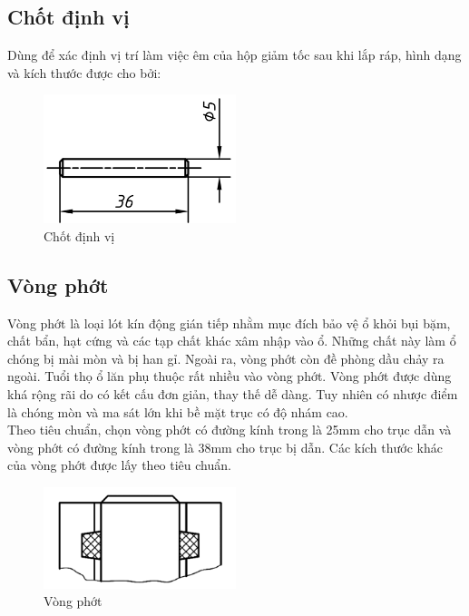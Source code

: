 \subsection{Chốt định vị}
Dùng để xác định vị trí làm việc êm của hộp giảm tốc sau khi lắp ráp, hình dạng và kích thước được cho bởi:
\begin{figure}[H]
    \centering
    \includegraphics[width=0.5\textwidth]{pictures/chotdinhvi.png}
    \caption{Chốt định vị}
\end{figure}
\subsection{Vòng phớt}
Vòng phớt là loại lót kín động gián tiếp nhằm mục đích bảo vệ ổ khỏi bụi bặm, chất bẩn, hạt cứng và các tạp chất khác xâm nhập vào ổ. Những chất này làm ổ chóng bị mài mòn và bị han gỉ. Ngoài ra, vòng phớt còn đề phòng dầu chảy ra ngoài. Tuổi thọ ổ lăn phụ thuộc rất nhiều vào vòng phớt. Vòng phớt được dùng khá rộng rãi do có kết cấu đơn giản, thay thế dễ dàng. Tuy nhiên có nhược điểm là chóng mòn và ma sát lớn khi bề mặt trục có độ nhám cao.\\
Theo tiêu chuẩn, chọn vòng phớt có đường kính trong là 25mm cho trục dẫn và vòng phớt có đường kính trong là 38mm cho trục bị dẫn. Các kích thước khác của vòng phớt được lấy theo tiêu chuẩn.
\begin{figure}[H]
    \centering
    \includegraphics[width=0.5\textwidth]{pictures/vongphot.png}
    \caption{Vòng phớt}
\end{figure}
\cleardoublepage